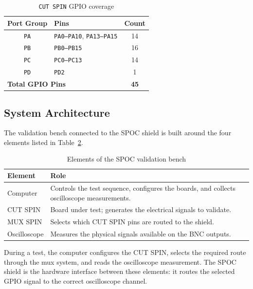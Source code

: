 \begin{table}[H]
\centering
\caption{\texttt{CUT SPIN} GPIO coverage}
\label{tab:gpio_coverage}
\begin{tabular}{|c|l|c|}
\hline
\textbf{Port Group} & \textbf{Pins} & \textbf{Count} \\ \hline
\texttt{PA} & \texttt{PA0--PA10}, \texttt{PA13--PA15} & 14 \\ \hline
\texttt{PB} & \texttt{PB0--PB15} & 16 \\ \hline
\texttt{PC} & \texttt{PC0--PC13} & 14 \\ \hline
\texttt{PD} & \texttt{PD2} & 1 \\ \hline
\multicolumn{2}{|l|}{\textbf{Total GPIO Pins}} & \textbf{45} \\ \hline
\end{tabular}
\end{table}

\subsection{System Architecture}\label{system-architecture}

The validation bench connected to the SPOC shield is built around the four
elements listed in Table~\ref{tab:system_elements}.

\begin{table}[H]
\centering
\caption{Elements of the SPOC validation bench}
\label{tab:system_elements}
\begin{tabular}{|l|p{10cm}|}
\hline
\textbf{Element} & \textbf{Role} \\ \hline
Computer &
Controls the test sequence, configures the boards, and collects oscilloscope measurements. \\ \hline

CUT SPIN &
Board under test; generates the electrical signals to \newline validate. \\ \hline

MUX SPIN &
Selects which CUT SPIN pins are routed to the shield. \\ \hline

Oscilloscope &
Measures the physical signals available on the BNC \newline outputs. \\ \hline
\end{tabular}
\end{table}
During a test, the computer configures the CUT SPIN, selects the
required route through the mux system, and reads the oscilloscope
measurement. The SPOC shield is the hardware interface between these
elements: it routes the selected GPIO signal to the correct oscilloscope
channel.


